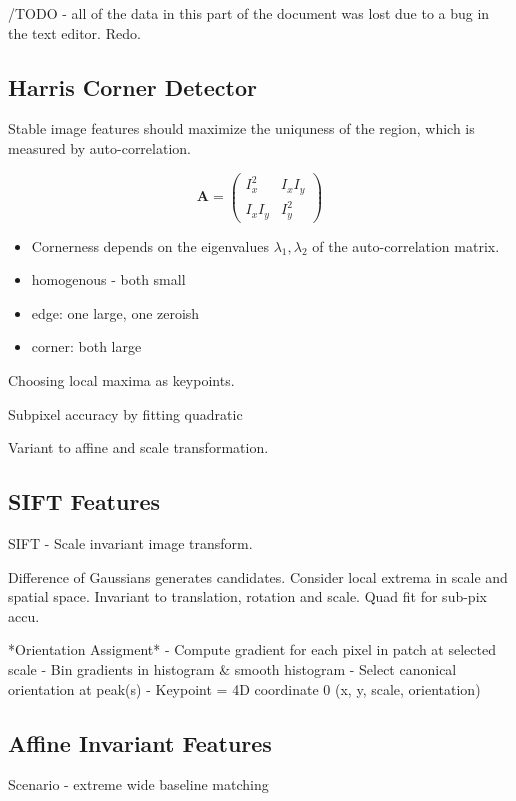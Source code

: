 /TODO - all of the data in this part of the document was lost due to a bug in the text editor. Redo.

\subsection{Harris Corner Detector}

Stable image features should maximize the uniquness of the region, which is measured by auto-correlation.

$$ 
\mathbf{A} = \left(  \begin{matrix} I_x^2 &  I_xI_y \\
I_xI_y & I_y^2
\end{matrix} \right) $$

\begin{itemize}
\item Cornerness depends on the eigenvalues $\lambda_1,\lambda_2$ of the auto-correlation matrix.
\item homogenous - both small
\item edge: one large, one zeroish
\item corner: both large
\end{itemize}

Choosing local maxima as keypoints. 

Subpixel accuracy by fitting quadratic 

Variant to affine and scale transformation.

\subsection{SIFT Features}

SIFT - Scale invariant image transform.

Difference of Gaussians generates candidates. 
Consider local extrema in scale and spatial space.
Invariant to translation, rotation and scale.
Quad fit for sub-pix accu.

*Orientation Assigment*
- Compute gradient for each pixel in patch at selected scale
- Bin gradients in histogram \& smooth histogram
- Select canonical orientation at peak(s)
- Keypoint = 4D coordinate 0 (x, y, scale, orientation)

\subsection{Affine Invariant Features}
Scenario - extreme wide baseline matching

